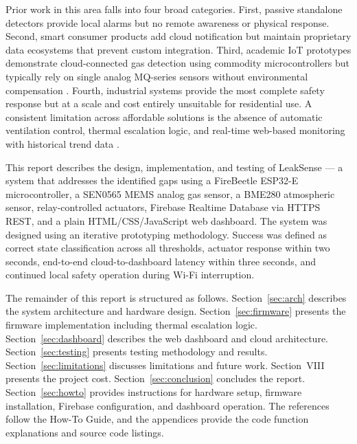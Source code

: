 \documentclass[a4paper,10pt,conference,onecolumn]{IEEEtran}
\begin{document}
Prior work in this area falls into four broad categories. First, passive
standalone detectors provide local alarms but no remote awareness or physical
response. Second, smart consumer products add cloud notification but maintain
proprietary data ecosystems that prevent custom integration. Third, academic
IoT prototypes demonstrate cloud-connected gas detection using commodity
microcontrollers but typically rely on single analog MQ-series sensors without
environmental compensation \cite{islam2020}\cite{sarkar2024}. Fourth,
industrial systems provide the most complete safety response but at a scale
and cost entirely unsuitable for residential use. A consistent limitation
across affordable solutions is the absence of automatic ventilation control,
thermal escalation logic, and real-time web-based monitoring with historical
trend data \cite{saeed2018}.

This report describes the design, implementation, and testing of LeakSense ---
a system that addresses the identified gaps using a FireBeetle ESP32-E
microcontroller, a SEN0565 MEMS analog gas sensor, a BME280 atmospheric
sensor, relay-controlled actuators, Firebase Realtime Database via HTTPS REST,
and a plain HTML/CSS/JavaScript web dashboard. The system was designed using
an iterative prototyping methodology. Success was defined as correct state
classification across all thresholds, actuator response within two seconds,
end-to-end cloud-to-dashboard latency within three seconds, and continued local
safety operation during Wi-Fi interruption.

The remainder of this report is structured as follows. Section~\ref{sec:arch}
describes the system architecture and hardware design.
Section~\ref{sec:firmware} presents the firmware implementation including
thermal escalation logic. Section~\ref{sec:dashboard} describes the web
dashboard and cloud architecture. Section~\ref{sec:testing} presents testing
methodology and results. Section~\ref{sec:limitations} discusses limitations
and future work. Section~VIII presents the project cost. Section~\ref{sec:conclusion}
concludes the report. Section~\ref{sec:howto} provides instructions for
hardware setup, firmware installation, Firebase configuration, and dashboard
operation. The references follow the How-To Guide, and the appendices provide
the code function explanations and source code listings.

\end{document}
